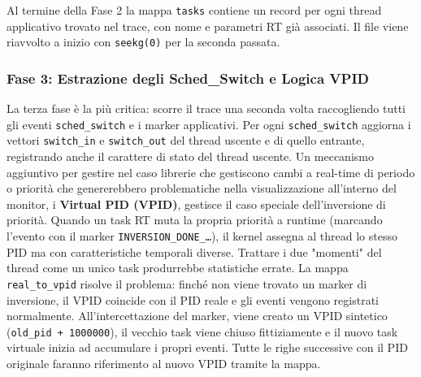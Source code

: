 	Al termine della Fase 2 la mappa \texttt{tasks} contiene un record per ogni
	thread applicativo trovato nel trace, con nome e parametri RT già associati.
	Il file viene riavvolto a inizio con \texttt{seekg(0)} per la seconda passata.
	
	
	\subsubsection{Fase 3: Estrazione degli Sched\_Switch e Logica VPID}
	
	La terza fase è la più critica: scorre il trace una seconda volta raccogliendo
	tutti gli eventi \texttt{sched\_switch} e i marker applicativi. Per ogni
	\texttt{sched\_switch} aggiorna i vettori \texttt{switch\_in} e
	\texttt{switch\_out} del thread uscente e di quello entrante, registrando anche
	il carattere di stato del thread uscente. Un meccanismo aggiuntivo per gestire nel caso librerie che gestiscono cambi a real-time di periodo o priorità che genererebbero problematiche nella visualizzazione all'interno del monitor, i \textbf{Virtual PID (VPID)}, gestisce il caso speciale dell'inversione di priorità. Quando un task RT muta la propria priorità
	a runtime (marcando l'evento con il marker \texttt{INVERSION\_DONE\_\ldots}), il
	kernel assegna al thread lo stesso PID ma con caratteristiche temporali diverse.
	Trattare i due "momenti" del thread come un unico task produrrebbe statistiche
	errate. La mappa \texttt{real\_to\_vpid} risolve il problema: finché non viene
	trovato un marker di inversione, il VPID coincide con il PID reale e gli eventi
	vengono registrati normalmente. All'intercettazione del marker, viene creato un
	VPID sintetico (\texttt{old\_pid + 1000000}), il vecchio task viene chiuso
	fittiziamente e il nuovo task virtuale inizia ad accumulare i propri eventi.
	Tutte le righe successive con il PID originale faranno riferimento al nuovo VPID
	tramite la mappa.
	
